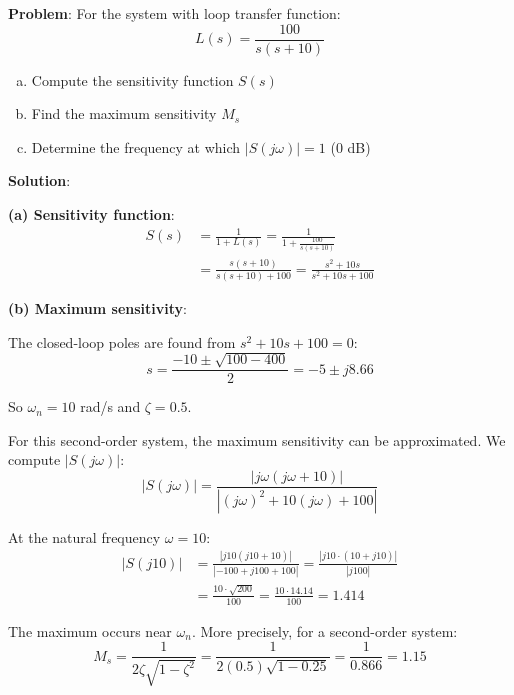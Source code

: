\textbf{Problem}: For the system with loop transfer function:
\begin{equation}
    L(s) = \frac{100}{s(s+10)}
\end{equation}

\begin{enumerate}[(a)]
    \item Compute the sensitivity function $S(s)$
    \item Find the maximum sensitivity $M_s$
    \item Determine the frequency at which $|S(j\omega)| = 1$ (0 dB)
\end{enumerate}

\textbf{Solution}:

\textbf{(a) Sensitivity function}:
\begin{align}
    S(s) &= \frac{1}{1 + L(s)} = \frac{1}{1 + \frac{100}{s(s+10)}} \\
    &= \frac{s(s+10)}{s(s+10) + 100} = \frac{s^2 + 10s}{s^2 + 10s + 100}
\end{align}

\textbf{(b) Maximum sensitivity}:

The closed-loop poles are found from $s^2 + 10s + 100 = 0$:
\begin{equation}
    s = \frac{-10 \pm \sqrt{100 - 400}}{2} = -5 \pm j8.66
\end{equation}

So $\omega_n = 10$ rad/s and $\zeta = 0.5$.

For this second-order system, the maximum sensitivity can be approximated. We compute $|S(j\omega)|$:
\begin{equation}
    |S(j\omega)| = \frac{|j\omega(j\omega + 10)|}{|(j\omega)^2 + 10(j\omega) + 100|}
\end{equation}

At the natural frequency $\omega = 10$:
\begin{align}
    |S(j10)| &= \frac{|j10(j10 + 10)|}{|-100 + j100 + 100|} = \frac{|j10 \cdot (10 + j10)|}{|j100|} \\
    &= \frac{10 \cdot \sqrt{200}}{100} = \frac{10 \cdot 14.14}{100} = 1.414
\end{align}

The maximum occurs near $\omega_n$. More precisely, for a second-order system:
\begin{equation}
    M_s = \frac{1}{2\zeta\sqrt{1-\zeta^2}} = \frac{1}{2(0.5)\sqrt{1-0.25}} = \frac{1}{0.866} = \boxed{1.15}
\end{equation}

